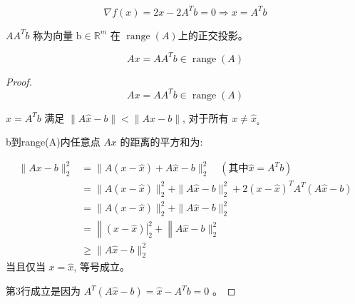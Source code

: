 $$ \nabla f(x)=2 x-2 A^{T} b=0 \Rightarrow x=A^{T} b $$

$ A A^{T} b $ 称为向量 $ \mathrm{b} \in \mathbb{R}^{m} $ 在 $ \operatorname{range} (A)$上的正交投影。

\begin{theorem}
    $$ A x=A A^{T} b \in \operatorname{range}(A) $$
\end{theorem}

\begin{proof}
    $$ A x=A A^{T} b \in \operatorname{range}(A) $$

    $ \hat{x}=A^{T} b $ 满足 $ \|A \hat{x}-b\|<\|A x-b\| $, 对于所有 $ x \neq \hat{x}_{\text {。 }} $

    b到range(A)内任意点 $ A x $ 的距离的平方和为:

$$
\begin{aligned}
\|A x-b\|_{2}^{2} &=\|A(x-\hat{x})+A \hat{x}-b\|_{2}^{2} \quad\left(其中 \hat{x}=A^{T} b\right) \\
&=\|A(x-\hat{x})\|_{2}^{2}+\|A \hat{x}-b\|_{2}^{2}+2(x-\hat{x})^{T} A^{T}(A \hat{x}-b) \\
&=\|A(x-\hat{x})\|_{2}^{2}+\|A \hat{x}-b\|_{2}^{2} \\
&=\left\|\left.(x-\hat{x})\right|_{2} ^{2}+\right\| A \hat{x}-b \|_{2}^{2} \\
& \geq\|A \hat{x}-b\|_{2}^{2}
\end{aligned}
$$
当且仅当 $ x=\hat{x} $, 等号成立。

第3行成立是因为 $ A^{T}(A \hat{x}-b)=\hat{x}-A^{T} b=0 $ 。
\end{proof}




